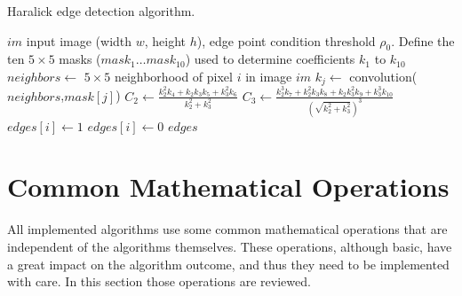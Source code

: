 \documentclass{ipol}
\numberwithin{equation}{section}
\numberwithin{table}{section}
\begin{document}
\begin{algorithm}[t]
\caption{Haralick edge detection algorithm.}
\label{algo:haralick}
\begin{algorithmic}[1]
\Require $im$ input image (width $w$, height $h$), edge point condition threshold $\rho_0$.
\State Define the ten $5\times5$ masks ($mask_1\dots mask_{10}$) used to determine coefficients $k_1$ to $k_{10}$ 
	\State $neighbors \leftarrow$ $5\times5$ neighborhood of pixel $i$ in image $im$
		\State $k_j \leftarrow$ convolution($neighbors$,$mask[j]$)
	\EndFor
	\State $C_2 \leftarrow \frac{k_2^2k_4 + k_2k_3k_5 + k_3^2k_6}{k_2^2 + k_3^2}$
	\State $C_3 \leftarrow \frac{k_2^3k_7 + k_2^2k_3k_8 + k_2k_3^2k_9 + k_3^3k_{10}}{(\sqrt{k_2^2 + k_3^2})^3}$
		\State $edges[i] \leftarrow 1$
	\Else
		\State $edges[i] \leftarrow 0$
	\EndIf
\EndFor
\Return $edges$
\end{algorithmic}
\end{algorithm}


\section{Common Mathematical Operations}
\label{sec:appendix1}

All implemented algorithms use some common mathematical operations that are independent of the algorithms themselves. 
These operations, although basic, have a great impact on the algorithm outcome, and thus they need to be 
implemented with care. In this section those operations are reviewed.



\end{document}
